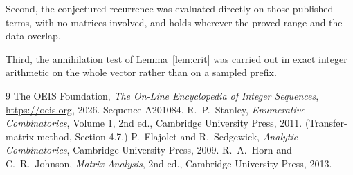 \documentclass[11pt,a4paper]{article}
\theoremstyle{plain}
\theoremstyle{definition}
\begin{document}
Second, the conjectured recurrence was evaluated directly on those published terms, with no
matrices involved, and holds wherever the proved range and the data overlap.

Third, the annihilation test of Lemma~\ref{lem:crit} was carried out in exact integer
arithmetic on the whole vector rather than on a sampled prefix.

\begin{thebibliography}{9}
 The OEIS Foundation, \emph{The On-Line Encyclopedia of Integer
Sequences}, \url{https://oeis.org}, 2026. Sequence A201084.
 R.~P.~Stanley, \emph{Enumerative Combinatorics}, Volume 1, 2nd ed.,
Cambridge University Press, 2011. (Transfer-matrix method, Section 4.7.)
 P.~Flajolet and R.~Sedgewick, \emph{Analytic Combinatorics}, Cambridge
University Press, 2009.
 R.~A.~Horn and C.~R.~Johnson, \emph{Matrix Analysis}, 2nd ed., Cambridge
University Press, 2013.
\end{thebibliography}
\end{document}

